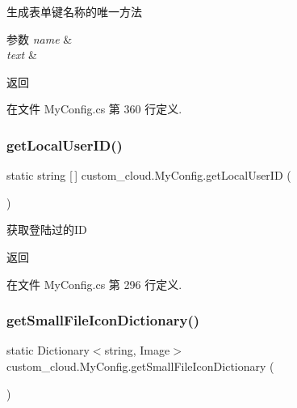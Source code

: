 生成表单键名称的唯一方法 


\begin{DoxyParams}{参数}
{\em name} & \\
\hline
{\em text} & \\
\hline
\end{DoxyParams}
\begin{DoxyReturn}{返回}

\end{DoxyReturn}


在文件 My\+Config.\+cs 第 360 行定义.

\mbox{\label{classcustom__cloud_1_1_my_config_aabb9bfe46a6d68631ab388023d1f2c7b}} 
\subsubsection{\texorpdfstring{get\+Local\+User\+I\+D()}{getLocalUserID()}}
{\footnotesize\ttfamily static string \mbox{[}$\,$\mbox{]} custom\+\_\+cloud.\+My\+Config.\+get\+Local\+User\+ID (\begin{DoxyParamCaption}{ }\end{DoxyParamCaption})\hspace{0.3cm}{\ttfamily [static]}}



获取登陆过的\+ID 

\begin{DoxyReturn}{返回}

\end{DoxyReturn}


在文件 My\+Config.\+cs 第 296 行定义.

\mbox{\label{classcustom__cloud_1_1_my_config_a11778cc1e96d5fb0f0aecf7cff529b26}} 
\subsubsection{\texorpdfstring{get\+Small\+File\+Icon\+Dictionary()}{getSmallFileIconDictionary()}}
{\footnotesize\ttfamily static Dictionary$<$string, Image$>$ custom\+\_\+cloud.\+My\+Config.\+get\+Small\+File\+Icon\+Dictionary (\begin{DoxyParamCaption}{ }\end{DoxyParamCaption})\hspace{0.3cm}{\ttfamily [static]}}



